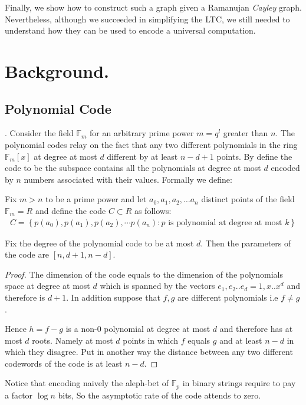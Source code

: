 \documentclass[manuscript,screen,review]{acmart}
\begin{document}
Finally, we show how to construct such a graph given a Ramanujan \emph{Cayley} graph. Nevertheless, although we succeeded in simplifying the LTC, we still needed to understand how they can be used to encode a universal computation.  



\section{Background.}
\subsection{Polynomial Code}. Consider the field $\mathbb{F}_{m}$ for an arbitrary prime power $m=q^{l}$ greater than $n$. The polynomial codes relay on the fact that any two different polynomials in the ring $\mathbb{F}_{m}\left[ x \right]$ at degree at most $d$ different by at least $n - d + 1$ points. By define the code to be the subspace contains all the polynomials at degree at most $d$ encoded by $n$ numbers associated with their values. Formally we define:     
\begin{definition}
  Fix $m > n $ to be a prime power and let $a_{0},a_{1},a_{2},\ldots a_{n}$ distinct points of the field $\mathbb{F}_{m} = R$  and define the code $C \subset R $ as follows:  
  \begin{equation*}
    \begin{split}
      C = \left\{p\left(a_{0}\right),p\left(a_{1}\right),p\left(a_{2}\right),\cdots p\left(a_{n}\right) : p \text{ is polynomial at degree at most } k \right\}
    \end{split}
  \end{equation*}
\end{definition}
\begin{lemma}
  Fix the degree of the polynomial code to be at most $d$. Then the parameters of the code are $[n,d + 1, n - d]$.  
  \label{polycode}
\end{lemma}
\begin{proof}
  The dimension of the code equals to the dimension of the polynomials space at degree at most $d$ which is spanned by the vectors $e_{1}, e_{2} .. e_{d} = 1, x .. x^{d}$ and therefore is $d+1$. In addition suppose that $f,g$ are different polynomials i.e $f\neq g$.

  Hence $h = f-g$ is a non-$0$ polynomial at degree at most $d$ and therefore has at most $d$ roots. Namely at most $d$ points in which $f$ equals $g$ and at least $n-d$ in which they disagree. Put in another way the distance between any two different codewords of the code is at least $n-d$.  
\end{proof}
Notice that encoding naively the aleph-bet of $\mathbb{F}_{p}$ in binary strings require to pay a factor $\log n$ bits, So the asymptotic rate of the code attends to zero.     
\end{document}
